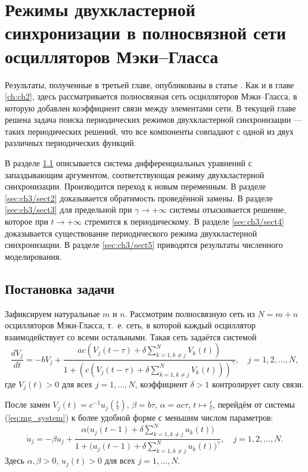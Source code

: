 \chapter{Режимы двухкластерной синхронизации в полносвязной сети осцилляторов Мэки--Гласса}\label{ch:ch3}

Результаты, полученные в третьей главе, опубликованы в статье \cite{scbib1}. Как и в главе \ref{ch:ch2}, здесь рассматривается полносвязная сеть осцилляторов Мэки--Гласса, в которую добавлен коэффициент связи между элементами сети. В текущей главе решена задача поиска периодических режимов двухкластерной синхронизации --- таких периодических решений, что все компоненты совпадают с одной из двух различных периодических функций.

В разделе \ref{sec:ch3/sect1} описывается система дифференциальных уравнений с запаздывающим аргументом, соответствующая режиму двухкластерной синхронизации. Производится переход к новым переменным. В разделе \ref{sec:ch3/sect2} доказывается обратимость проведённой замены. В разделе \ref{sec:ch3/sect3} для предельной при $\gamma \to +\infty$ системы отыскивается решение, которое при $t \to +\infty$ стремится к периодическому. В разделе \ref{sec:ch3/sect4} доказывается существование периодического режима двухкластерной синхронизации. В разделе \ref{sec:ch3/sect5} приводятся результаты численного моделирования.

\section{Постановка задачи}\label{sec:ch3/sect1}
Зафиксируем натуральные $m$ и $n$. Рассмотрим полносвязную сеть из $N = m + n$ осцилляторов Мэки-Гласса, т.~е. сеть, в которой каждый осциллятор взаимодействует со всеми остальными. Такая сеть задаётся системой
%
\begin{equation}
	\label{eq:mg_system}
	\dfrac{d V_{j}}{dt}= -bV_{j} + \dfrac{ac\left(V_{j}(t - \tau) + \delta\sum_{k=1,k\neq j}^{N}V_{k}(t)\right)}{1 + \left(c\left(V_{j}(t - \tau) + \delta\sum_{k=1,k\neq j}^{N}V_{k}(t)\right)\right)^{\gamma}}, \quad j=1, 2, \ldots, N,
\end{equation}
где $V_j(t) > 0$ для всех $j = 1, \ldots, N$, коэффициент $\delta > 1$ контролирует силу связи. 

После замен $V_j(t) = c^{-1}u_j(\frac{t}{\tau})$, $\beta = b\tau$, $\alpha=ac\tau$, $t \mapsto \frac{t}{\tau}$,
перейдём от системы (\ref{eq:mg_system}) к более удобной форме с меньшим числом параметров:
%
\begin{equation}
	\label{eq:mg_system_norm}
	\dot{u}_j=-\beta u_j+\frac{\alpha\big(u_j(t - 1) + \delta\sum_{k = 1, k\neq j}^{N}u_{k}(t)\big)}{1+\big(u_j(t - 1) + \delta\sum_{k = 1, k \neq j}^{N}u_{k}(t)\big)^\gamma}, \quad j = 1, 2, \ldots, N.
\end{equation}
%
Здесь $\alpha, \beta > 0$, $u_j(t) > 0$ для всех $j = 1, \ldots, N$.

